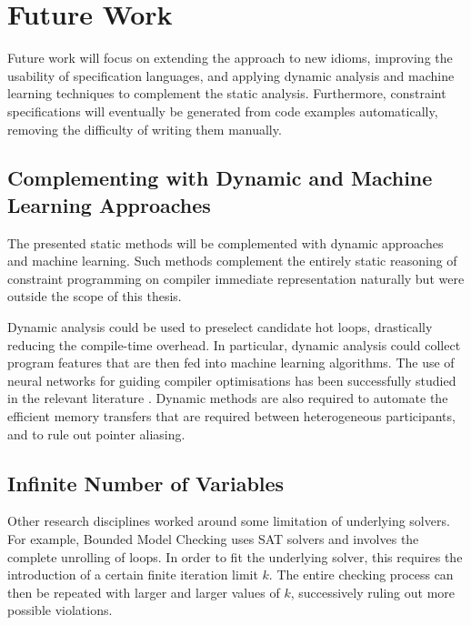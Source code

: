 \section{Future Work}

    Future work will focus on extending the approach to new idioms,
    improving the usability of specification languages, and
    applying dynamic analysis and machine learning techniques to complement the
    static analysis.
    Furthermore, constraint specifications will eventually be generated from
    code examples automatically, removing the difficulty of writing them
    manually.

\subsection*{Complementing with Dynamic and Machine Learning Approaches}

    The presented static methods will be complemented with dynamic approaches
    and machine learning.
    Such methods complement the entirely static reasoning of constraint
    programming on compiler immediate representation naturally but were
    outside the scope of this thesis.

    Dynamic analysis could be used to preselect candidate hot loops, drastically
    reducing the compile-time overhead.
    In particular, dynamic analysis could collect program features that are
    then fed into machine learning algorithms.
    The use of neural networks for guiding compiler optimisations has been
    successfully studied in the relevant literature
    \citep{DBLP:journals/pieee/WangO18}.
    Dynamic methods are also required to automate the efficient memory transfers
    that are required between heterogeneous participants, and to rule out
    pointer aliasing.

\subsection*{Infinite Number of Variables}

    Other research disciplines worked around some limitation of underlying
    solvers.
    For example, Bounded Model Checking \cite{Clarke:2001:BMC:510986.510987}
    uses SAT solvers and involves the complete unrolling of loops.
    In order to fit the underlying solver, this requires the introduction of a
    certain finite iteration limit $k$.
    The entire checking process can then be repeated with larger and larger
    values of $k$, successively ruling out more possible violations.

